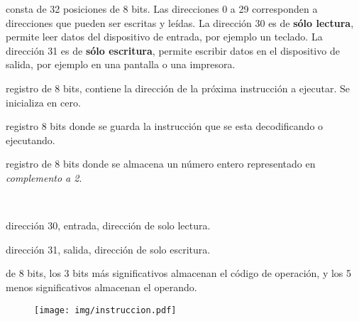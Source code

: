 \documentclass[12pt]{article}
\begin{document}
\begin{description}
    \itemsep2pt \parskip0pt 

    \item[Memoria:] consta de 32 posiciones de 8 bits. Las direcciones 0 a 29
        corresponden a direcciones que pueden ser escritas y leídas. La
        dirección 30 es de \textbf{sólo lectura}, permite leer datos del
        dispositivo de entrada, por ejemplo un teclado. La dirección 31 es de
        \textbf{sólo escritura}, permite escribir datos en el dispositivo de
        salida, por ejemplo en una pantalla o una impresora.

    \item[Registro PC:] registro de 8 bits, contiene la dirección de la
        próxima instrucción a ejecutar. Se inicializa en cero.

    \item[Registro IR:] registro 8 bits donde se guarda la instrucción que se
        esta decodificando o ejecutando.

    \item[Registro acumulador:] registro de 8 bits donde se almacena un
        número entero representado en \emph{complemento a 2}.

    \item[Etiquetas predefinidas:]~

        \begin{description}
            \itemsep2pt \parskip0pt 

            \item[IN:] dirección 30, entrada, dirección de solo lectura.

            \item[OUT:] dirección 31, salida, dirección de solo escritura.

        \end{description}

    \item[Instrucciones:] de 8 bits, los 3 bits más significativos almacenan
        el código de operación, y los 5 menos significativos almacenan el
        operando.

        \begin{figure}[h]
            \centering
            \texttt{[image: img/instruccion.pdf]}
        \end{figure}

\end{description}
\end{document}
